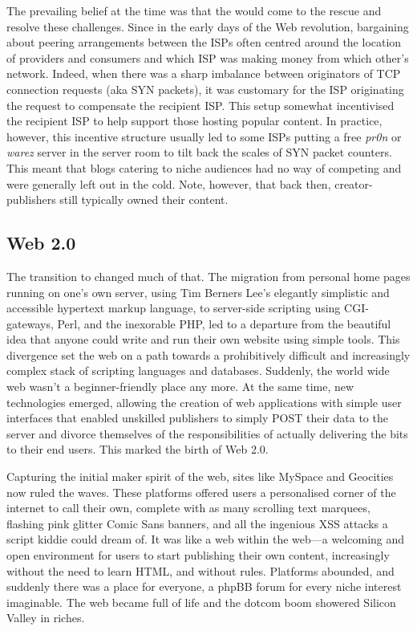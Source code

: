 The prevailing belief at the time was that the  would come to the rescue and resolve these challenges. Since in the early days of the Web revolution, bargaining about peering arrangements between the ISPs often centred around the location of providers and consumers and which ISP was making money from which other's network. Indeed, when there was a sharp imbalance between originators of TCP connection requests (aka SYN packets), it was customary for the  ISP originating the request to compensate the recipient ISP. This setup somewhat incentivised the recipient ISP to help support those hosting popular content. In practice, however, this incentive structure usually led to some ISPs putting a free \emph{pr0n} or \emph{warez} server in the server room to tilt back the scales of SYN packet counters. This meant that blogs catering to niche audiences had no way of competing and were generally left out in the cold. Note, however, that back then, creator-publishers still typically owned their content.

\subsection{Web 2.0 \statusgreen}\label{sec:web_2}

The transition to  changed much of that. The migration from personal home pages running on one's own server, using Tim Berners Lee's elegantly simplistic and accessible hypertext markup language, to server-side scripting using CGI-gateways, Perl, and the inexorable PHP, led to a departure from the beautiful idea that anyone could write and run their own website using simple tools. This divergence set the web on a path towards a prohibitively difficult and increasingly complex stack of scripting languages and databases. Suddenly, the world wide web wasn't a beginner-friendly place any more. At the same time, new technologies emerged, allowing the creation of web applications with simple user interfaces that enabled unskilled publishers to simply POST their data to the server and divorce themselves of the responsibilities of actually delivering the bits to their end users. This marked the birth of Web 2.0.

Capturing the initial maker spirit of the web, sites like MySpace and Geocities now ruled the waves. These platforms offered users a personalised corner of the internet to call their own, complete with as many scrolling text marquees, flashing pink glitter Comic Sans banners, and all the ingenious XSS attacks a script kiddie could dream of. It was like a web within the web---a welcoming and open environment for users to start publishing their own content, increasingly without the need to learn HTML, and without rules. Platforms abounded, and suddenly there was a place for everyone, a phpBB forum for every niche interest imaginable. The web became full of life and the dotcom boom showered Silicon Valley in riches.

